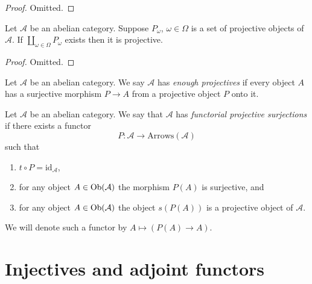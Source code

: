 \begin{proof}
Omitted.
\end{proof}

\begin{lemma}
\label{lemma-coproduct-projectives}
Let $\mathcal{A}$ be an abelian category.
Suppose $P_\omega$, $\omega \in \Omega$ is a set of projective
objects of $\mathcal{A}$. If $\coprod_{\omega \in \Omega} P_\omega$
exists then it is projective.
\end{lemma}

\begin{proof}
Omitted.
\end{proof}

\begin{definition}
\label{definition-enough-projectives}
Let $\mathcal{A}$ be an abelian category.
We say $\mathcal{A}$ has {\it enough projectives}
if every object $A$ has a surjective morphism
$P \to A$ from a projective object $P$ onto it.
\end{definition}

\begin{definition}
\label{definition-functorial-projective-surjections}
Let $\mathcal{A}$ be an abelian category.
We say that $\mathcal{A}$ has {\it functorial projective surjections}
if there exists a functor
$$
P : \mathcal{A} \longrightarrow \text{Arrows}(\mathcal{A})
$$
such that
\begin{enumerate}
\item $t \circ P = \text{id}_\mathcal{A}$,
\item for any object $A \in \mathop{\mathrm{Ob}}\nolimits(\mathcal{A})$
the morphism $P(A)$ is surjective, and
\item for any object $A \in \mathop{\mathrm{Ob}}\nolimits(\mathcal{A})$
the object $s(P(A))$ is a projective object of $\mathcal{A}$.
\end{enumerate}
We will denote such a functor by
$A \mapsto (P(A) \to A)$.
\end{definition}

















\section{Injectives and adjoint functors}
\label{section-adjoint}

